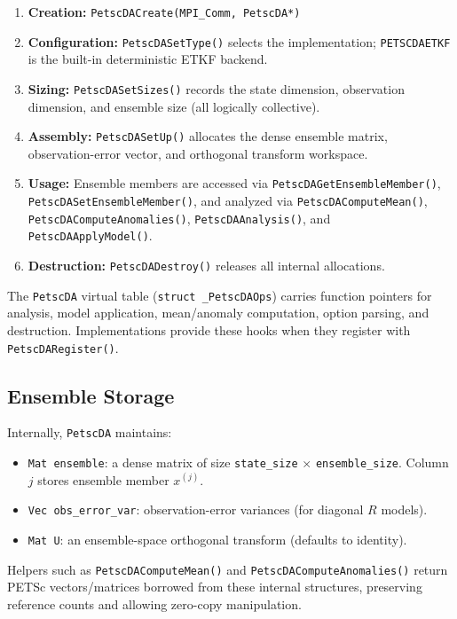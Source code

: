\documentclass[11pt]{article}
\begin{document}
\begin{enumerate}[nosep]
  \item \textbf{Creation:} \texttt{PetscDACreate(MPI\_Comm, PetscDA*)}
  \item \textbf{Configuration:} \texttt{PetscDASetType()} selects the implementation; \texttt{PETSCDAETKF} is the built-in deterministic ETKF backend.
  \item \textbf{Sizing:} \texttt{PetscDASetSizes()} records the state dimension, observation dimension, and ensemble size (all logically collective).
  \item \textbf{Assembly:} \texttt{PetscDASetUp()} allocates the dense ensemble matrix, observation-error vector, and orthogonal transform workspace.
  \item \textbf{Usage:} Ensemble members are accessed via \texttt{PetscDAGetEnsembleMember()}, \texttt{PetscDASetEnsembleMember()}, and analyzed via \texttt{PetscDAComputeMean()}, \texttt{PetscDAComputeAnomalies()}, \texttt{PetscDAAnalysis()}, and \texttt{PetscDAApplyModel()}.
  \item \textbf{Destruction:} \texttt{PetscDADestroy()} releases all internal allocations.
\end{enumerate}

The \texttt{PetscDA} virtual table (\texttt{struct \_PetscDAOps}) carries function pointers for analysis, model application, mean/anomaly computation, option parsing, and destruction. Implementations provide these hooks when they register with \texttt{PetscDARegister()}.

\subsection{Ensemble Storage}

Internally, \texttt{PetscDA} maintains:

\begin{itemize}[nosep]
  \item \texttt{Mat ensemble}: a dense matrix of size \texttt{state\_size} $\times$ \texttt{ensemble\_size}. Column $j$ stores ensemble member $x^{(j)}$.
  \item \texttt{Vec obs\_error\_var}: observation-error variances (for diagonal $R$ models).
  \item \texttt{Mat U}: an ensemble-space orthogonal transform (defaults to identity).
\end{itemize}

Helpers such as \texttt{PetscDAComputeMean()} and \texttt{PetscDAComputeAnomalies()} return PETSc vectors/matrices borrowed from these internal structures, preserving reference counts and allowing zero-copy manipulation.
\end{document}
